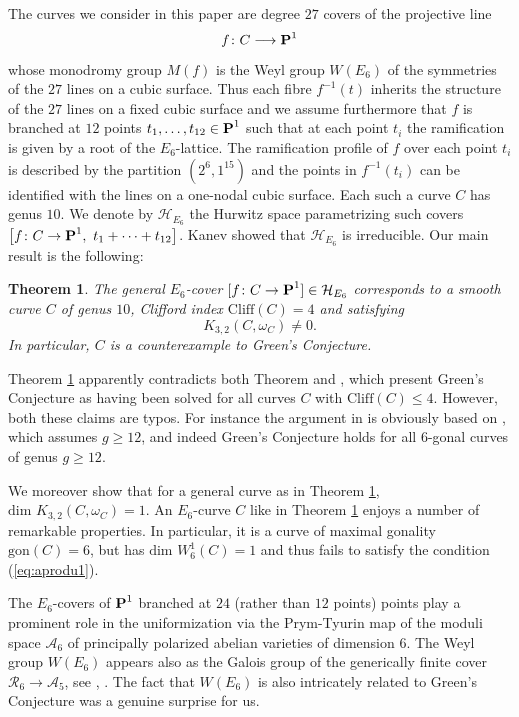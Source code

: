 \documentclass[11pt]{amsart}
\newtheorem{theorem}{Theorem}[section]
\theoremstyle{definition}
\def\PP{{\textbf P}}
\def\cA{\mathcal{A}}
\def\cH{\mathcal{H}}
\begin{document}
The curves we consider in this paper  are degree $27$ covers of the projective line 
$$f\colon C\longrightarrow \PP^1$$
whose monodromy group $M(f)$ is the Weyl group $W(E_6)$ of the symmetries of the $27$ lines on a cubic surface. Thus each fibre $f^{-1}(t)$ inherits the structure of the $27$ lines on a fixed cubic surface and we assume furthermore that $f$ is branched at $12$ points $t_1, \ldots, t_{12}\in \PP^1$  such that at each point $t_i$ the ramification is given by a root of the $E_6$-lattice. The ramification profile of $f$ over each point $t_i$ is described by the partition $(2^6, 1^{15})$ and the points in $f^{-1}(t_i)$ can be identified with the lines on a one-nodal cubic surface. Each such a curve $C$ has genus $10$. We denote by $\mathcal{H}_{E_6}$ the Hurwitz space parametrizing such covers $\bigl[f\colon C\rightarrow \PP^1,\ t_1+\cdots+t_{12}\bigr]$. Kanev \cite{K2} showed that $\mathcal{H}_{E_6}$ is irreducible. Our main result is the following:

\begin{theorem}\label{thm:main}
The general $E_6$-cover $[f\colon C\rightarrow \PP^1]\in \cH_{E_6}$ corresponds to a smooth curve $C$ of genus $10$, Clifford index $\mathrm{Cliff}(C)=4$ and satisfying 
$$K_{3,2}(C, \omega_C)\neq 0.$$
In particular,  $C$ is a counterexample to Green's Conjecture.
\end{theorem}

Theorem \ref{thm:main} apparently contradicts both Theorem \cite[Theorem 1.3]{AF2} and \cite[p.184]{Eis}, which present Green's Conjecture as having been solved for all curves $C$ with $\mbox{Cliff}(C)\leq 4$.  However, both these claims are typos. For instance the argument in \cite{AF2} is obviously based on \cite[Theorem 4.8]{AF2}, which assumes $g\geq 12$, and indeed Green's Conjecture holds for all $6$-gonal curves of genus $g\geq 12$. 

\vskip 4pt

We moreover show that for a general curve as in Theorem \ref{thm:main},
$\mbox{dim } K_{3,2}(C, \omega_C)=1$. An $E_6$-curve $C$ like in Theorem \ref{thm:main} enjoys a number of remarkable properties. In particular, it is a curve of maximal gonality $\mbox{gon}(C)=6$, but has $\mbox{dim } W^1_6(C)=1$ and thus fails to satisfy the condition (\ref{eq:aprodu1}). 

\vskip 4pt

The $E_6$-covers of $\PP^1$ branched at $24$ (rather than $12$ points) points play a prominent role in the uniformization \cite{ADFIO} via the Prym-Tyurin map of the moduli space $\cA_6$ of principally polarized abelian varieties of dimension $6$. The Weyl group $W(E_6)$ appears also as the Galois group of the generically finite cover $\mathcal{R}_6\rightarrow \cA_5$, see \cite{Don}, \cite{DS}. The fact that $W(E_6)$ is also intricately related to Green's Conjecture was a genuine surprise for us.
\end{document}
